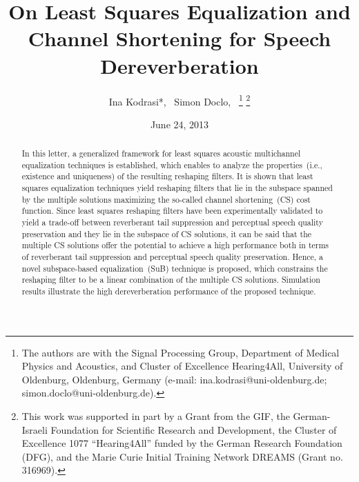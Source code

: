 \documentclass[11pt,draftcls,onecolumn]{IEEEtran}
\begin{document}
\newlength\figureheight
\newlength\figurewidth
\setlength\figureheight{3.6cm}
\setlength\figurewidth{6.5cm}
\title{On Least Squares Equalization and Channel Shortening for Speech Dereverberation}

\date{June 24, 2013}

\author{Ina Kodrasi*,~ Simon Doclo,~%
\thanks{The authors are with the Signal Processing Group, Department of Medical Physics and Acoustics, and Cluster of Excellence Hearing4All, University of Oldenburg, Oldenburg, Germany (e-mail: \mbox{ina.kodrasi@uni-oldenburg.de}; simon.doclo@uni-oldenburg.de).}
\thanks{
This work was supported in part by a Grant from the GIF, the German-Israeli Foundation for Scientific Research and Development, the Cluster of Excellence 1077 ``Hearing4All'' funded by the German Research Foundation (DFG), and the Marie Curie Initial Training Network DREAMS (Grant no. 316969).}
}



\maketitle

\begin{abstract}

In this letter, a generalized framework for least squares acoustic multichannel equalization techniques is established, which enables to analyze the properties~(i.e., existence and uniqueness) of the resulting reshaping filters.
It is shown that least squares equalization techniques yield reshaping filters that lie in the subspace spanned by the multiple solutions maximizing the so-called channel shortening~(CS) cost function.
Since least squares reshaping filters have been experimentally validated to yield a trade-off between reverberant tail suppression and perceptual speech quality preservation and they lie in the subspace of CS solutions, it can be said that the multiple CS solutions offer the potential to achieve a high performance both in terms of reverberant tail suppression and perceptual speech quality preservation.
Hence, a novel subspace-based equalization~(SuB) technique is proposed, which constrains the reshaping filter to be a linear combination of the multiple CS solutions. 
Simulation results illustrate the high dereverberation performance of the proposed technique.
\end{abstract}
\end{document}

